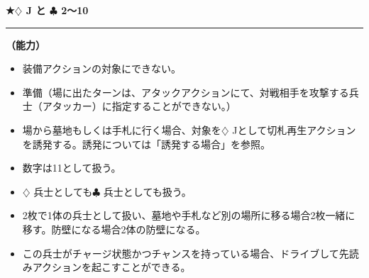 \documentclass[twocolumn,a5paper,papersize,10pt]{jarticle}
\begin{document}
\vspace{-1zh}

 
\vspace{2mm}
\begin{tcolorbox}[title={\small\bf【Character】策士}{\scriptsize （兵士）}]

  {\scriptsize\bf ★{\normalsize $\diamondsuit$} J と {\normalsize $\clubsuit$} 2〜10}

\vspace{1mm} %
\hrule height 0.1mm depth 0mm width 62mm %
\vspace{1mm} %

{\bf（能力）}


\vspace{-1zh}%
\begin{itemize}
\setlength{\leftskip}{-0.3cm}
\setlength{\parskip}{0pt} %

\item 装備アクションの対象にできない。

\item 準備（場に出たターンは、アタックアクションにて、対戦相手を攻撃する兵士（アタッカー）に指定することができない。）

\item 場から墓地もしくは手札に行く場合、対象を{\normalsize $\diamondsuit$} Jとして切札再生アクションを誘発する。誘発については「誘発する場合」を参照。

\item 数字は11として扱う。

\item {\normalsize $\diamondsuit$} 兵士としても{\normalsize $\clubsuit$} 兵士としても扱う。

\item 2枚で1体の兵士として扱い、墓地や手札など別の場所に移る場合2枚一緒に移す。防壁になる場合2体の防壁になる。

\item この兵士がチャージ状態かつチャンスを持っている場合、ドライブして先読みアクションを起こすことができる。
\vspace{-1zh}%
\end{itemize}

\vspace{1mm} %
\end{tcolorbox}

\vspace{-1zh}
\end{document}
